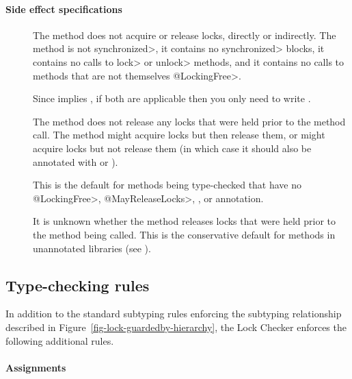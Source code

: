 \paragraph{Side effect specifications}

\begin{description}

\item[]
  The method does not acquire or release locks,
  directly or indirectly.  The method is not \<synchronized>, it contains
  no \<synchronized> blocks, it contains no calls to \<lock> or \<unlock>
  methods, and it contains no calls to methods that are not themselves \<@LockingFree>.

  Since
   implies , if both are applicable
  then you only need to write .

\item[]
  The method does not release any locks that were held prior
  to the method call.  The method might acquire locks but then release
  them, or might acquire locks but not release them (in which case it should
  also be annotated with
   or
  ).

  This is the default for methods being type-checked that have no \<@LockingFree>,
  \<@MayReleaseLocks>, , or 
  annotation.

\item[]
  It is unknown whether the method releases
  locks that were held prior to the method being called.
  This is the conservative default for methods in unannotated libraries (see ).

\end{description}


\subsection{Type-checking rules}

In addition to the standard subtyping rules enforcing the subtyping relationship
described in Figure~\ref{fig-lock-guardedby-hierarchy}, the Lock Checker enforces
the following additional rules.


\paragraph{Assignments}

